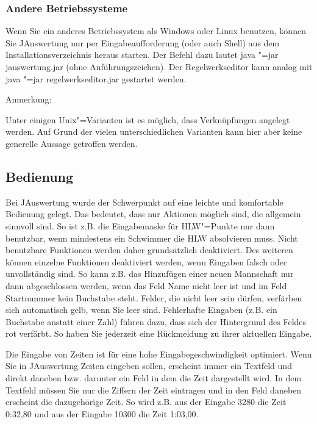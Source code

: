 \documentclass[11pt,a4paper,twoside,ngerman]{article}
\begin{document}
\subsubsection*{Andere Betriebssysteme}
Wenn Sie ein anderes Betriebssystem als Windows oder Linux benutzen, können Sie JAuswertung nur per Eingabeaufforderung (oder auch Shell) aus dem Installationsverzeichnis heraus starten. Der Befehl dazu lautet \glqq{}java "=jar jauswertung.jar\grqq{} (ohne Anführungszeichen). Der Regelwerkseditor kann analog mit \glqq{}java "=jar regelwerkseditor.jar\grqq{} gestartet werden.

\begin{bfseries}Anmerkung:\end{bfseries} Unter einigen Unix"=Varianten ist es möglich, dass Verknüpfungen angelegt werden. Auf Grund der vielen unterschiedlichen Varianten kann hier aber keine generelle Aussage getroffen werden.


\subsection*{Bedienung}
Bei JAuswertung wurde der Schwerpunkt auf eine leichte und komfortable Bedienung gelegt. Das bedeutet, dass nur Aktionen möglich sind, die allgemein sinnvoll sind. So ist z.B. die Eingabemaske für HLW"=Punkte nur dann benutzbar, wenn mindestens ein Schwimmer die HLW absolvieren muss. Nicht benutzbare Funktionen werden daher grundsätzlich deaktiviert. Des weiteren können einzelne Funktionen deaktiviert werden, wenn Eingaben falsch oder unvollständig sind. So kann z.B. das Hinzufügen einer neuen Mannschaft nur dann abgeschlossen werden, wenn das Feld \glqq{}Name\grqq{} nicht leer ist und im Feld \glqq{}Startnummer\grqq{} kein Buchstabe steht. Felder, die nicht leer sein dürfen, verfärben sich automatisch gelb, wenn Sie leer sind. Fehlerhafte Eingaben (z.B. ein Buchstabe anstatt einer Zahl) führen dazu, dass sich der Hintergrund des Feldes rot verfärbt. So haben Sie jederzeit eine Rückmeldung zu ihrer aktuellen Eingabe.

Die Eingabe von Zeiten ist für eine hohe Eingabegeschwindigkeit optimiert. Wenn Sie in JAuswertung Zeiten eingeben sollen, erscheint immer ein Textfeld und direkt daneben bzw. darunter ein Feld in dem die Zeit dargestellt wird. In dem Textfeld müssen Sie nur die Ziffern der Zeit eintragen und in den Feld daneben erscheint die dazugehörige Zeit. So wird z.B. aus der Eingabe 3280 die Zeit 0:32,80 und aus der Eingabe 10300 die Zeit 1:03,00.
\end{document}
